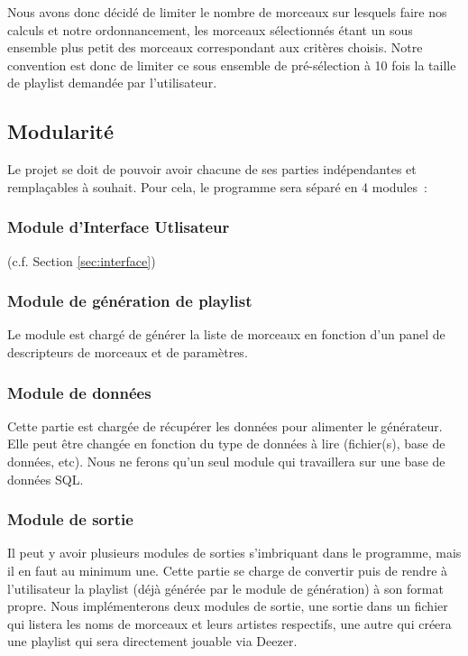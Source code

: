 \documentclass[11pt,a4paper]{article}
\begin{document}
Nous avons donc décidé de limiter le nombre de morceaux sur lesquels faire nos
calculs et notre ordonnancement, les morceaux sélectionnés étant un sous ensemble
plus petit des morceaux correspondant aux critères choisis. Notre convention est
donc de limiter ce sous ensemble de pré-sélection à 10 fois la taille de playlist
demandée par l’utilisateur.

\subsection{Modularité}
    
Le projet se doit de pouvoir avoir chacune de ses parties indépendantes et
remplaçables à souhait. Pour cela, le programme sera séparé en 4 modules~:

\subsubsection{Module d'Interface Utlisateur}

(c.f. Section \ref{sec:interface})

\subsubsection{Module de génération de playlist}

Le module est chargé de générer la liste de morceaux en fonction d’un panel de
descripteurs de morceaux et de paramètres.

\subsubsection{Module de données}

Cette partie est chargée de récupérer les données pour alimenter le générateur.
Elle peut être changée en fonction du type de données à lire (fichier(s), base de
données, etc). Nous ne ferons qu’un seul module qui travaillera sur une base de
données SQL.

\subsubsection{Module de sortie}

Il peut y avoir plusieurs modules de sorties s'imbriquant dans le programme, mais
il en faut au minimum une. Cette partie se charge de convertir puis de rendre à
l’utilisateur la playlist (déjà générée par le module de génération) à son format
propre. Nous implémenterons deux modules de sortie, une sortie dans un fichier
qui listera les noms de morceaux et leurs artistes respectifs, une autre qui
créera une playlist qui sera directement jouable via Deezer.
\end{document}
